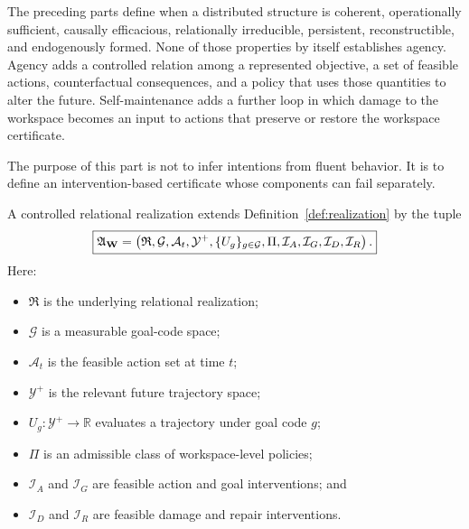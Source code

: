 

The preceding parts define when a distributed structure is coherent,
operationally sufficient, causally efficacious, relationally irreducible,
persistent, reconstructible, and endogenously formed. None of those
properties by itself establishes agency. Agency adds a controlled relation
among a represented objective, a set of feasible actions, counterfactual
consequences, and a policy that uses those quantities to alter the future.
Self-maintenance adds a further loop in which damage to the workspace becomes
an input to actions that preserve or restore the workspace certificate.

The purpose of this part is not to infer intentions from fluent behavior. It
is to define an intervention-based certificate whose components can fail
separately.


A controlled relational realization extends Definition~\ref{def:realization}
by the tuple
\[
\boxed{
\mathfrak A_{\mathbf W}
=
\left(
\mathfrak R,
\mathcal G,
\mathcal A_t,
\mathcal Y^+,
\{U_g\}_{g\in\mathcal G},
\Pi,
\mathcal I_A,
\mathcal I_G,
\mathcal I_D,
\mathcal I_R
\right).
}
\]
Here:
\begin{itemize}
\item \(\mathfrak R\) is the underlying relational realization;
\item \(\mathcal G\) is a measurable goal-code space;
\item \(\mathcal A_t\) is the feasible action set at time \(t\);
\item \(\mathcal Y^+\) is the relevant future trajectory space;
\item \(U_g:\mathcal Y^+\to\mathbb R\) evaluates a trajectory under goal
 code \(g\);
\item \(\Pi\) is an admissible class of workspace-level policies;
\item \(\mathcal I_A\) and \(\mathcal I_G\) are feasible action and goal
 interventions; and
\item \(\mathcal I_D\) and \(\mathcal I_R\) are feasible damage and repair
 interventions.
\end{itemize}

